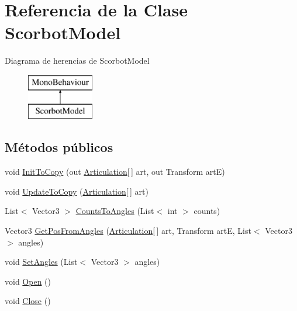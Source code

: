 \hypertarget{class_scorbot_model}{}\section{Referencia de la Clase Scorbot\+Model}
\label{class_scorbot_model}
Diagrama de herencias de Scorbot\+Model\begin{figure}[H]
\begin{center}
\leavevmode
\includegraphics[height=2.000000cm]{class_scorbot_model}
\end{center}
\end{figure}
\subsection*{Métodos públicos}
\begin{DoxyCompactItemize}
\item 
void \mbox{\hyperlink{class_scorbot_model_aba471bffb5190b184e14ce3598784d47}{Init\+To\+Copy}} (out \mbox{\hyperlink{class_articulation}{Articulation}}\mbox{[}$\,$\mbox{]} art, out Transform artE)
\item 
void \mbox{\hyperlink{class_scorbot_model_a78e73b1e1b2cda29a55529326ba2ca90}{Update\+To\+Copy}} (\mbox{\hyperlink{class_articulation}{Articulation}}\mbox{[}$\,$\mbox{]} art)
\item 
List$<$ Vector3 $>$ \mbox{\hyperlink{class_scorbot_model_a30c77a2653cea0ff41081d150b7e3bca}{Counts\+To\+Angles}} (List$<$ int $>$ counts)
\item 
Vector3 \mbox{\hyperlink{class_scorbot_model_ad09db01ea00a7f638ecbeabce57737cf}{Get\+Pos\+From\+Angles}} (\mbox{\hyperlink{class_articulation}{Articulation}}\mbox{[}$\,$\mbox{]} art, Transform artE, List$<$ Vector3 $>$ angles)
\item 
void \mbox{\hyperlink{class_scorbot_model_a74549ede37f30edafb1dbf07c0730cdd}{Set\+Angles}} (List$<$ Vector3 $>$ angles)
\item 
void \mbox{\hyperlink{class_scorbot_model_aaac42c1b3077127fcacfc463750ddd02}{Open}} ()
\item 
void \mbox{\hyperlink{class_scorbot_model_a2f4d3c10d7f8ce39bc2fce114efcc97f}{Close}} ()
\end{DoxyCompactItemize}
